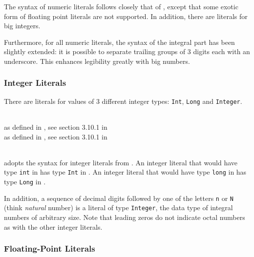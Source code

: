 The syntax of numeric literals follows closely that of \java{}, except that some exotic form of floating point literals are not supported.
In addition, there are literals for big integers.

Furthermore, for all numeric literals, the syntax of the integral part has been slightly extended: it is possible to separate trailing groups of 3 digits each with an underscore. This enhances legibility greatly with big numbers.


\subsubsection{Integer Literals}

There are literals for values of 3 different integer types: \texttt{Int}, \texttt{Long} and \texttt{Integer}.

\begin{flushleft}
  \oder{}  \oder{} \\
 as defined in \java{}, see section 3.10.1 in \cite{langspec3}\\
 as defined in \java{}, see section 3.10.1 in \cite{langspec3}\\
  \\
\end{flushleft}

\frege{} adopts the syntax for integer literals from \java{}. An integer literal that would have type \texttt{int} in \java{} has type \texttt{Int} in \frege{}. An integer literal that would have type \texttt{long} in \java{} has type \texttt{Long} in \frege{}.

In addition, a sequence of decimal digits followed by one of the letters \texttt{n} or \texttt{N} (think \emph{natural} number) is a literal of type \texttt{Integer}, the data type of integral numbers of arbitrary size. Note that leading zeros do not indicate octal numbers as with the other integer literals.


\subsubsection{Floating-Point Literals}

